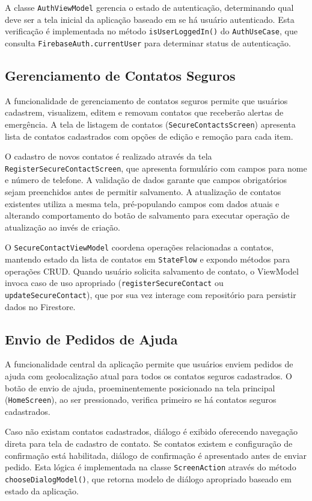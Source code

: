 A classe \texttt{AuthViewModel} gerencia o estado de autenticação, determinando qual deve ser a tela inicial da aplicação baseado em se há usuário autenticado. Esta verificação é implementada no método \texttt{isUserLoggedIn()} do \texttt{AuthUseCase}, que consulta \texttt{FirebaseAuth.currentUser} para determinar status de autenticação.

\subsection{Gerenciamento de Contatos Seguros}
A funcionalidade de gerenciamento de contatos seguros permite que usuários cadastrem, visualizem, editem e removam contatos que receberão alertas de emergência. A tela de listagem de contatos (\texttt{SecureContactsScreen}) apresenta lista de contatos cadastrados com opções de edição e remoção para cada item.

O cadastro de novos contatos é realizado através da tela \texttt{RegisterSecureContactScreen}, que apresenta formulário com campos para nome e número de telefone. A validação de dados garante que campos obrigatórios sejam preenchidos antes de permitir salvamento. A atualização de contatos existentes utiliza a mesma tela, pré-populando campos com dados atuais e alterando comportamento do botão de salvamento para executar operação de atualização ao invés de criação.

O \texttt{SecureContactViewModel} coordena operações relacionadas a contatos, mantendo estado da lista de contatos em \texttt{StateFlow} e expondo métodos para operações CRUD. Quando usuário solicita salvamento de contato, o ViewModel invoca caso de uso apropriado (\texttt{registerSecureContact} ou \texttt{updateSecureContact}), que por sua vez interage com repositório para persistir dados no Firestore.

\subsection{Envio de Pedidos de Ajuda}
A funcionalidade central da aplicação permite que usuários enviem pedidos de ajuda com geolocalização atual para todos os contatos seguros cadastrados. O botão de envio de ajuda, proeminentemente posicionado na tela principal (\texttt{HomeScreen}), ao ser pressionado, verifica primeiro se há contatos seguros cadastrados.

Caso não existam contatos cadastrados, diálogo é exibido oferecendo navegação direta para tela de cadastro de contato. Se contatos existem e configuração de confirmação está habilitada, diálogo de confirmação é apresentado antes de enviar pedido. Esta lógica é implementada na classe \texttt{ScreenAction} através do método \texttt{chooseDialogModel()}, que retorna modelo de diálogo apropriado baseado em estado da aplicação.

